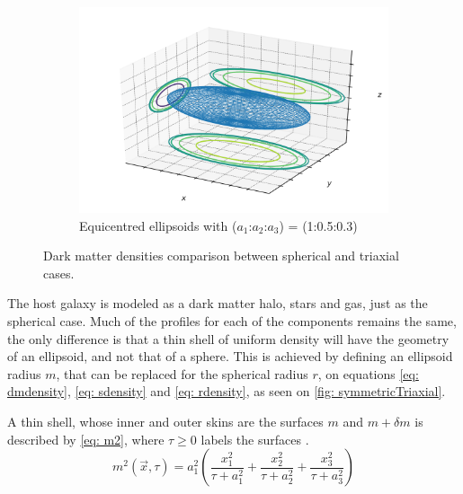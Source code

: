 \begin{figure}[h]
\begin{subfigure}[t]{0.6\textwidth}
				\includegraphics[width=\textwidth]{"../Files/Week 7/ellipsoid_"}
				\caption{Equicentred ellipsoids with ($a_1$:$a_2$:$a_3$) = (1:0.5:0.3)}
			\end{subfigure}
			\caption{Dark matter densities comparison between spherical and triaxial cases.}
			\label{fig: symmetricTriaxial}
		\end{figure}
	
		The host galaxy is modeled as a dark matter halo, stars and gas, just as the spherical case. Much of the profiles for each of the components remains the same, the only difference is that a thin shell of uniform density will have the geometry of an ellipsoid, and not that of a sphere. This is achieved by defining an ellipsoid radius $m$, that can be replaced for the spherical radius $r$, on equations \ref{eq: dmdensity}, \ref{eq: sdensity} and \autoref{eq: rdensity}, as seen on \autoref{fig: symmetricTriaxial}. 
		
		A thin shell, whose inner and outer skins are the surfaces $m$ and $m + \delta m$ is described by \autoref{eq: m2}, where $\tau \geq 0$ labels the surfaces \cite{binney2011galactic}.
		\begin{equation}\label{eq: m2}
		m^2(\vec{x}, \tau) = a_1^2\left(\frac{x_1^{2}}{\tau + a_{1}^{2}} + \frac{x_2^{2}}{\tau + a_{2}^{2}} + \frac{x_3^{2}}{\tau + a_{3}^{2}}\right)
		\end{equation}
		
